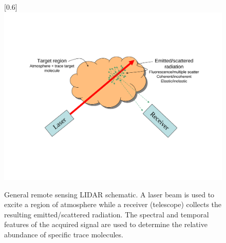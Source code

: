 \begin{figure}
\scalebox{0.6}[0.6]{
\includegraphics[bb=40 150 489 500]
{general_LIDAR/general_LIDAR.pdf}
}
\caption[General LIDAR schematic]{General remote sensing LIDAR schematic. A laser beam is used to excite a region of atmosphere while a receiver (telescope) collects the resulting emitted/scattered radiation. The spectral and temporal features of the acquired signal are used to determine the relative abundance of specific trace molecules.}
\label{general LIDAR}
\end{figure}
